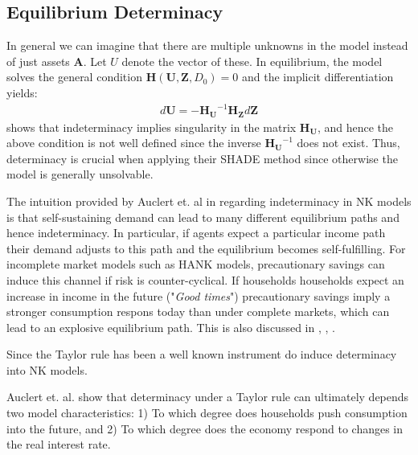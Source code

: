 
\subsection{Equilibrium Determinacy}
In general we can imagine that there are multiple unknowns in the model instead of just assets $\boldsymbol{A}$. Let $U$ denote the vector of these. In equilibrium, the model solves the general condition $\boldsymbol{H}\left(\boldsymbol{U},\mathbf{Z},D_{0}\right)=0$ and the implicit differentiation yields: 
\begin{gather*}
d\boldsymbol{U}=-\boldsymbol{H_{U}}^{-1}\boldsymbol{H_{Z}}d\boldsymbol{Z}
\end{gather*}
\citet{auclert2019using} shows that indeterminacy implies singularity in the matrix $\boldsymbol{H_{U}}$, and hence the above condition is not well defined since the inverse $\boldsymbol{H_{U}}^{-1}$ does not exist. Thus, determinacy is crucial when applying their SHADE method since otherwise the model is generally unsolvable. 

The intuition provided by Auclert et. al in \citet{auclert2018intertemporal} regarding indeterminacy in NK models is that self-sustaining demand can lead to many different equilibrium paths and hence indeterminacy. In particular, if agents expect a particular income path their demand adjusts to this path and the equilibrium becomes self-fulfilling. For incomplete market models such as HANK models, precautionary savings can induce this channel if risk is counter-cyclical. If households households expect an increase in income in the future ("\textit{Good times}") precautionary savings imply a stronger consumption respons today than under complete markets, which can lead to an explosive equilibrium path. This is also discussed in \citet{ravn2016macroeconomic}, \citet{bilbiie2018monetary}, \citet{acharya2020understanding}.


Since \citet{woodford2003interest} the Taylor rule has been a well known instrument do induce determinacy into NK models. 

Auclert et. al. show that determinacy under a Taylor rule can ultimately depends two model characteristics: 1) To which degree does households push consumption into the future, and 2) To which degree does the economy respond to changes in the real interest rate. 


